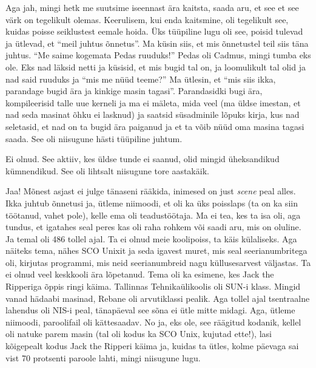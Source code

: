 Aga jah, mingi hetk me suutsime iseennast ära kaitsta, saada aru, et see et see värk on tegelikult olemas. Keerulisem, kui enda kaitsmine, oli tegelikult see, kuidas poisse seiklustest eemale hoida. Üks tüüpiline lugu oli see, poisid tulevad ja ütlevad, et \enquote{meil juhtus õnnetus}. Ma küsin siis, et mis õnnetustel teil siis täna juhtus. \enquote{Me saime kogemata Pedas ruuduks!} Pedas oli Cadmus, mingi tumba  eks ole. Eks nad läksid netti ja küsisid, et mis bugid tal on, ja loomulikult tal olid ja  nad said ruuduks ja \enquote{mis me nüüd teeme?} Ma ütlesin, et \enquote{mis siis ikka, parandage bugid ära ja kinkige masin tagasi}. Parandasidki bugi ära, kompileerisid talle uue kerneli ja ma ei mäleta, mida veel (ma üldse imestan, et nad seda masinat õhku ei lasknud) ja saatsid süsadminile lõpuks kirja, kus nad seletasid, et nad on ta bugid ära paiganud ja et ta võib nüüd oma masina tagasi saada. See oli niisugune hästi tüüpiline juhtum.


Ei olnud. See aktiiv, kes üldse tunde ei saanud, olid mingid üheksandikud kümnendikud. See oli lihtsalt niisugune tore aastakäik. 


Jaa! Mõnest asjast ei julge tänaseni rääkida, inimesed on just \emph{scene} peal alles. Ikka juhtub õnnetusi ja, ütleme niimoodi, et oli ka üks poisslaps (ta on ka siin töötanud, vahet pole), kelle ema oli teadustöötaja.  Ma ei tea, kes ta isa oli, aga tundus, et igatahes seal peres kas oli raha rohkem või saadi aru, mis on oluline.  Ja temal oli 486 tollel ajal. Ta ei olnud meie koolipoiss, ta käis külaliseks. Aga näiteks tema, nähes SCO Unixit ja seda igavest muret, mis seal seerianumbritega oli, kirjutas programmi, mis neid seerianumbreid nagu küllusesarvest väljastas. Ta ei olnud veel keskkooli ära lõpetanud. Tema oli ka esimene,  kes Jack the Ripperiga õppis ringi käima. Tallinnas Tehnikaülikoolis oli SUN-i klass. Mingid vanad hädaabi masinad, Rebane oli arvutiklassi pealik. Aga tollel ajal tsentraalne lahendus oli NIS-i peal, tänapäeval see sõna ei ütle mitte midagi. Aga,  ütleme niimoodi, paroolifail oli kättesaadav. No ja, eks ole, see räägitud kodanik, kellel oli natuke parem masin (tal oli kodus ka SCO Unix, kujutad ette!), lasi kõigepealt kodus Jack the Ripperi käima ja, kuidas ta ütles,  kolme päevaga sai vist 70 protsenti paroole lahti, mingi niisugune lugu. 

